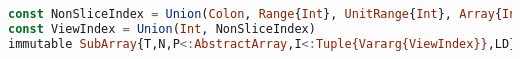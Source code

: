 \begin{singlespace}
\begin{lstlisting}[language=julia]
const NonSliceIndex = Union(Colon, Range{Int}, UnitRange{Int}, Array{Int,1})
const ViewIndex = Union(Int, NonSliceIndex)
immutable SubArray{T,N,P<:AbstractArray,I<:Tuple{Vararg{ViewIndex}},LD} <: AbstractArray{T,N}
\end{lstlisting}
\end{singlespace}














